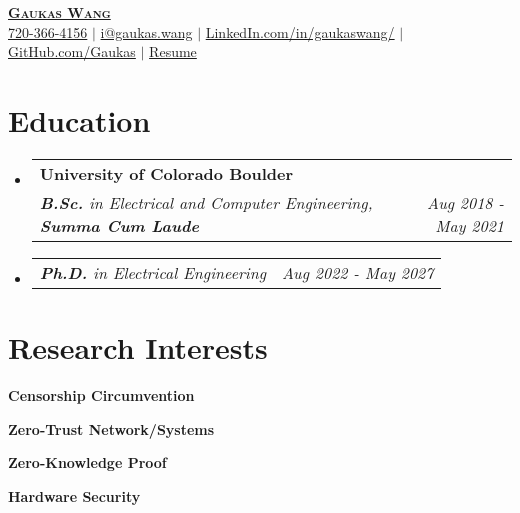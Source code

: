 \documentclass[letterpaper,11pt]{article}
\makeatletter
\newcommand{\resumeSubheading}[4]{
  \vspace{-2pt}\item
    \begin{tabular*}{0.97\textwidth}[t]{l@{\extracolsep{\fill}}r}
      \textbf{#1} & #2 \\
      \textit{\small#3} & \textit{\small #4} \\
    \end{tabular*}\vspace{-7pt}
}
\newcommand{\resumeSubSubheading}[2]{
    \item
    \begin{tabular*}{0.97\textwidth}{l@{\extracolsep{\fill}}r}
      \textit{\small#1} & \textit{\small #2} \\
    \end{tabular*}\vspace{-7pt}
}
\newcommand{\resumeSubHeadingListStart}{\begin{itemize}[leftmargin=0.15in, label={}]}
\newcommand{\resumeSubHeadingListEnd}{\end{itemize}}
\makeatother
\begin{document}
\begin{center}
  \href{https://gaukas.wang}{\textbf{\Huge \scshape Gaukas Wang}} \\ \vspace{1pt}
    \href{tel:720-366-4156}{{720-366-4156}} $|$
    \href{mailto:i@gaukas.wang}{{i@gaukas.wang}} $|$ 
    \href{https://www.linkedin.com/in/gaukaswang/}{{LinkedIn.com/in/gaukaswang/}} $|$
    \href{https://github.com/Gaukas}{{GitHub.com/Gaukas}} $|$ 
    \href{https://gauk.as/resume}{{Resume}}
    
\end{center}


\section{Education}
\resumeSubHeadingListStart
  \resumeSubheading
    {University of Colorado Boulder}{}
    {\textbf{B.Sc.} in Electrical and Computer Engineering, \textbf{Summa Cum Laude}}{Aug 2018 - May 2021}
  \resumeSubSubheading
    {\textbf{Ph.D.} in Electrical Engineering}{Aug 2022 - May 2027}
  \resumeSubHeadingListEnd

\section{Research Interests}
\begin{itemize}[] {
  \item \textbf{Censorship Circumvention}
  \item \textbf{Zero-Trust Network/Systems}
  \item \textbf{Zero-Knowledge Proof}
  \item \textbf{Hardware Security}
}
\end{itemize}

\end{document}
